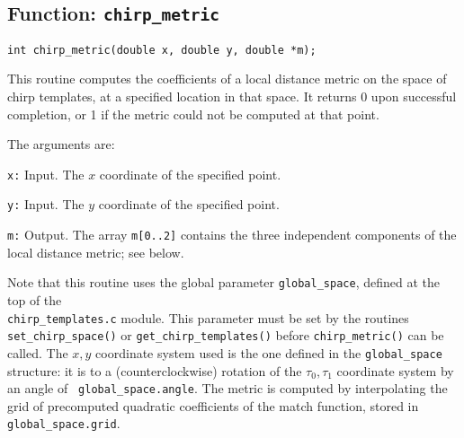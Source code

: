 \clearpage
\subsection{Function: {\tt chirp\_metric}}
\label{ss:chirp_metric}

\begin{verbatim}
int chirp_metric(double x, double y, double *m);
\end{verbatim}
This routine computes the coefficients of a local distance metric on
the space of chirp templates, at a specified location in that space.
It returns 0 upon successful completion, or 1 if the metric could not
be computed at that point.

The arguments are:

\begin{description}
\item{\tt x:}
  Input.  The $x$ coordinate of the specified point.

\item{\tt y:}
  Input.  The $y$ coordinate of the specified point.

\item{\tt m:}
  Output.  The array {\tt m[0..2]} contains the three independent
  components of the local distance metric; see below.

\end{description}

Note that this routine uses the global parameter {\tt global\_space},
defined at the top of the\\
{\tt chirp\_templates.c} module.  This
parameter must be set by the routines {\tt set\_chirp\_space()} or
{\tt get\_chirp\_templates()} before {\tt chirp\_metric()} can be
called.  The $x,y$ coordinate system used is the one defined in the
{\tt global\_space} structure: it is to a (counterclockwise) rotation
of the $\tau_0,\tau_1$ coordinate system by an angle of {\tt
global\_space.angle}.  The metric is computed by interpolating the
grid of precomputed quadratic coefficients of the match function,
stored in {\tt global\_space.grid}.

